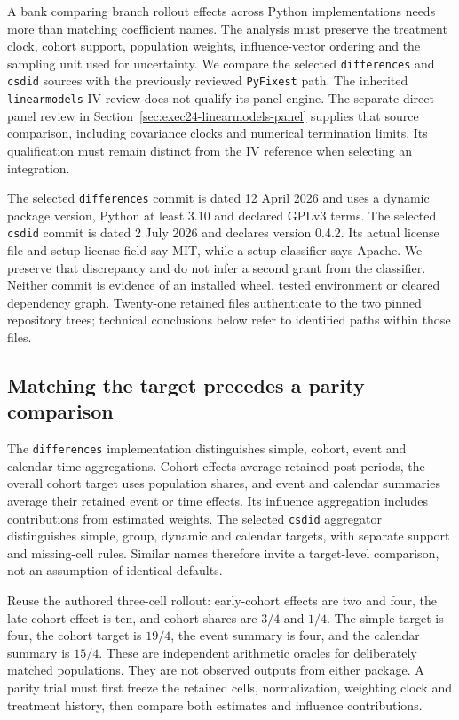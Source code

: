 A bank comparing branch rollout effects across Python implementations needs
more than matching coefficient names. The analysis must preserve the treatment
clock, cohort support, population weights, influence-vector ordering and the
sampling unit used for uncertainty. We compare the selected \texttt{differences}
and \texttt{csdid} sources with the previously reviewed \texttt{PyFixest}
path. The inherited \texttt{linearmodels} IV review does not qualify its panel
engine. The separate direct panel review in
Section~\ref{sec:exec24-linearmodels-panel} supplies that source comparison,
including covariance clocks and numerical termination limits. Its qualification
must remain distinct from the IV reference when selecting an integration.
\citep{exec24_panelpy_contract,exec23_pyfixest_reuse_source,exec22_linearmodels_reuse}

The selected \texttt{differences} commit is dated 12 April 2026 and uses a
dynamic package version, Python at least 3.10 and declared GPLv3 terms.
The selected \texttt{csdid} commit is dated 2 July 2026 and declares version
0.4.2. Its actual license file and setup license field say MIT, while a setup
classifier says Apache. We preserve that discrepancy and do not infer a
second grant from the classifier. Neither commit is evidence of an installed
wheel, tested environment or cleared dependency graph. Twenty-one retained
files authenticate to the two pinned repository trees; technical conclusions
below refer to identified paths within those files.
\citep{exec24_panelpy_differences,exec24_panelpy_csdid}

\subsection{Matching the target precedes a parity comparison}
The \texttt{differences} implementation distinguishes simple, cohort,
event and calendar-time aggregations. Cohort effects average retained post
periods, the overall cohort target uses population shares, and event and
calendar summaries average their retained event or time effects. Its influence
aggregation includes contributions from estimated weights. The selected
\texttt{csdid} aggregator distinguishes simple, group, dynamic and calendar
targets, with separate support and missing-cell rules. Similar names therefore
invite a target-level comparison, not an assumption of identical defaults.
\citep{exec24_panelpy_differences,exec24_panelpy_csdid}

Reuse the authored three-cell rollout: early-cohort effects are two and four,
the late-cohort effect is ten, and cohort shares are $3/4$ and $1/4$.
The simple target is four, the cohort target is $19/4$, the event summary is
four, and the calendar summary is $15/4$. These are independent arithmetic
oracles for deliberately matched populations. They are not observed outputs
from either package. A parity trial must first freeze the retained cells,
normalization, weighting clock and treatment history, then compare both
estimates and influence contributions.
\citep{exec24_panelpy_contract}

